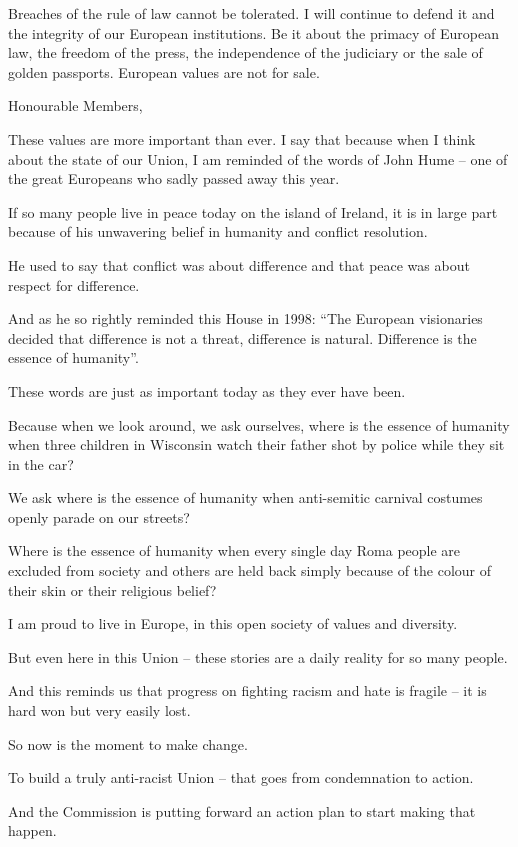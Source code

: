 \documentclass[a4paper,11pt]{article}
\begin{document}
Breaches of the rule of law cannot be tolerated. I will continue to defend it and the integrity of our European institutions. Be it about the primacy of European law, the freedom of the press, the independence of the judiciary or the sale of golden passports. European values are not for sale.

 

Honourable Members,

These values are more important than ever. I say that because when I think about the state of our Union, I am reminded of the words of John Hume – one of the great Europeans who sadly passed away this year.

If so many people live in peace today on the island of Ireland, it is in large part because of his unwavering belief in humanity and conflict resolution.

He used to say that conflict was about difference and that peace was about respect for difference.

And as he so rightly reminded this House in 1998: “The European visionaries decided that difference is not a threat, difference is natural. Difference is the essence of humanity”.

These words are just as important today as they ever have been.

Because when we look around, we ask ourselves, where is the essence of humanity when three children in Wisconsin watch their father shot by police while they sit in the car?

We ask where is the essence of humanity when anti-semitic carnival costumes openly parade on our streets?

Where is the essence of humanity when every single day Roma people are excluded from society and others are held back simply because of the colour of their skin or their religious belief?

I am proud to live in Europe, in this open society of values and diversity.

But even here in this Union – these stories are a daily reality for so many people.

And this reminds us that progress on fighting racism and hate is fragile – it is hard won but very easily lost.

So now is the moment to make change.

To build a truly anti-racist Union – that goes from condemnation to action. 

And the Commission is putting forward an action plan to start making that happen.
\end{document}
